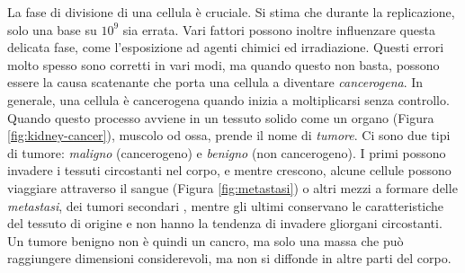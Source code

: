 La fase di divisione di una cellula è cruciale. Si stima che durante la replicazione, solo una base su $10^9$ \cite{DNAReplication} sia errata. Vari fattori possono inoltre influenzare questa delicata fase, come l'esposizione ad agenti chimici ed irradiazione. Questi errori molto spesso sono corretti in vari modi, ma quando questo non basta, possono essere la causa scatenante che porta una cellula a diventare \textit{cancerogena}. In generale, una cellula è cancerogena quando inizia a moltiplicarsi senza controllo. Quando questo processo avviene in un tessuto solido come un organo (Figura \ref{fig:kidney-cancer}), muscolo od ossa, prende il nome di \textit{tumore}. Ci sono due tipi di tumore: \textit{maligno} (cancerogeno) e \textit{benigno} (non cancerogeno). I primi possono invadere i tessuti circostanti nel corpo, e mentre crescono, alcune cellule possono viaggiare attraverso il sangue (Figura \ref{fig:metastasi}) o altri mezzi a formare delle \textit{metastasi}, dei tumori secondari \cite{differencecancertumor:online}, mentre gli ultimi conservano le caratteristiche del tessuto di origine e non hanno la tendenza di invadere gliorgani circostanti. Un tumore benigno non è quindi un cancro, ma solo una massa che può raggiungere dimensioni considerevoli, ma non si diffonde in altre parti del corpo.
